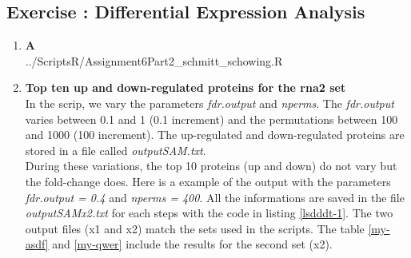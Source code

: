 \documentclass[10pt,a4paper]{article}
\newcommand{\exercise}[1]
{
  \stepcounter{subsection}
  \subsection*{Exercise \thesubsection: #1}

}
\begin{document}
\newpage
\exercise{Differential Expression Analysis}
\begin{enumerate}
	
	\item \textbf{A}\\

		 {../ScriptsR/Assignment6Part2\string_schmitt\string_schowing.R}
	
	\item \textbf{Top ten up and down-regulated proteins for the rna2 set}\\
	In the scrip, we vary the parameters \textit{fdr.output} and \textit{nperms}. The \textit{fdr.output} varies between 0.1 and 1 (0.1 increment) and the permutations between 100 and 1000 (100 increment). The up-regulated and down-regulated proteins are stored in a file called \textit{outputSAM.txt}.\\
	During these variations, the top 10 proteins (up and down) do not vary but the fold-change does. Here is a example of the output with the parameters \textit{fdr.output = 0.4} and \textit{nperms = 400}. All the informations are saved in the file \textit{outputSAMx2.txt} for each steps with the code in listing \ref{lsdddt-1}. The two output files (x1 and x2) match the sets used in the scripts. The table \ref{my-asdf} and \ref{my-qwer} include the results for the second set (x2).
	

\end{enumerate}
\end{document}
